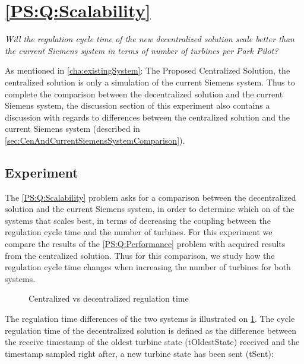 \section{\ref{PS:Q:Scalability}}

\textit{Will the regulation cycle time of the new decentralized solution scale better than the current Siemens system in terms of number of turbines per Park Pilot?}\newline\newline

\noindent As mentioned in \cref{cha:existingSystem}: The Proposed Centralized Solution, the centralized solution is only a simulation of the current Siemens system. Thus to complete the comparison between the decentralized solution and the current Siemens system, the discussion section of this experiment also contains a discussion with regards to differences between the centralized solution and the current Siemens system (described in \cref{sec:CenAndCurrentSiemensSystemComparison}).

\subsection{Experiment}
\label{subsec:Exper:Scale}

The \ref{PS:Q:Scalability} problem asks for a comparison between the decentralized solution and the current Siemens system, in order to determine which on of the systems that scales best, in terms of decreasing the coupling between the regulation cycle time and the number of turbines. For this experiment we compare the results of the \ref{PS:Q:Performance} problem with acquired results from the centralized solution. Thus for this comparison, we study how the regulation cycle time changes when increasing the number of turbines for both systems.


\begin{figure}[b]
	\centering
	{}
	\newline
	
	\newline
	
	{}
	
	\caption{Centralized vs decentralized regulation time}
	\label{fig:timingCentralVSDecentral}
\end{figure}

The regulation time differences of the two systems is illustrated on \cref{fig:timingCentralVSDecentral}. The cycle regulation time of the decentralized solution is defined as the difference between the receive timestamp of the oldest turbine state (tOldestState) received and the timestamp sampled right after, a new turbine state has been sent (tSent):

